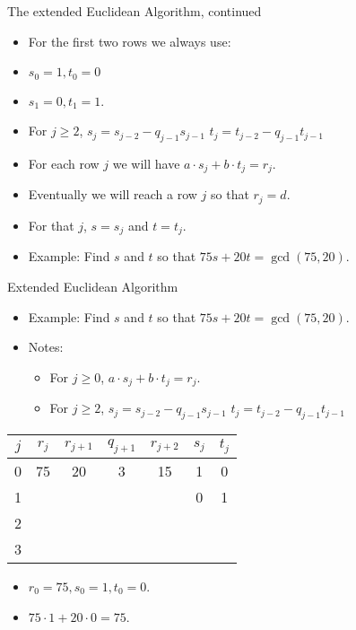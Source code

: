 \documentclass{beamer}
\begin{document}
\begin{frame}{The extended Euclidean Algorithm, continued}

\begin{itemize}
  \item For the first two rows we always use:
  \item  $s_0=1, t_0=0$
  \item  $s_1=0, t_1=1$.
  \item For $j\geq 2$, $s_j=s_{j-2} - q_{j-1}s_{j-1}$ \quad $t_j=t_{j-2} - q_{j-1}t_{j-1}$
  \item For each row $j$ we will have $a \cdot s_j + b \cdot t_j = r_j$.
  \item Eventually we will reach a row $j$ so that $r_j = d$.
  \item For that $j$, $s=s_j$ and $t=t_j$.
  \item Example: Find $s$ and $t$ so that $75s+20t = \gcd(75, 20)$.
\end{itemize}

\end{frame}

\beamerdefaultoverlayspecification{}

\begin{frame}{Extended Euclidean Algorithm}

\begin{itemize}
  \item Example: Find $s$ and $t$ so that $75s+20t = \gcd(75, 20)$.
  \item Notes:
  \begin{itemize}
    \item For $j\geq0$, $a \cdot s_j + b \cdot t_j = r_j$.
    \item For $j\geq 2$, $s_j=s_{j-2} - q_{j-1}s_{j-1}$ \quad $t_j=t_{j-2} - q_{j-1}t_{j-1}$
  \end{itemize}
\end{itemize}

\vspace{1em}

\begin{tabular}{|c|c|c|c|c|c|c|}\hline
$j$   &  $r_{j}$    & $r_{j+1}$ & $q_{j+1}$ & $r_{j+2}$ & $s_j$ & $t_j$ \\ \hline\hline
0     &  75         &  20       &    3      &   15      &  1    &   0   \\ \hline
1     &             &           &           &           &  0    &   1   \\ \hline
2     &             &           &           &           &       &       \\ \hline
3     &             &           &           &           &       &       \\ \hline
\end{tabular}

\vspace{1em}

\begin{itemize}
  \item $r_0 = 75, s_0=1, t_0=0$.
  \item $75\cdot 1 + 20 \cdot 0 = 75$.
\end{itemize}

\end{frame}
\end{document}
